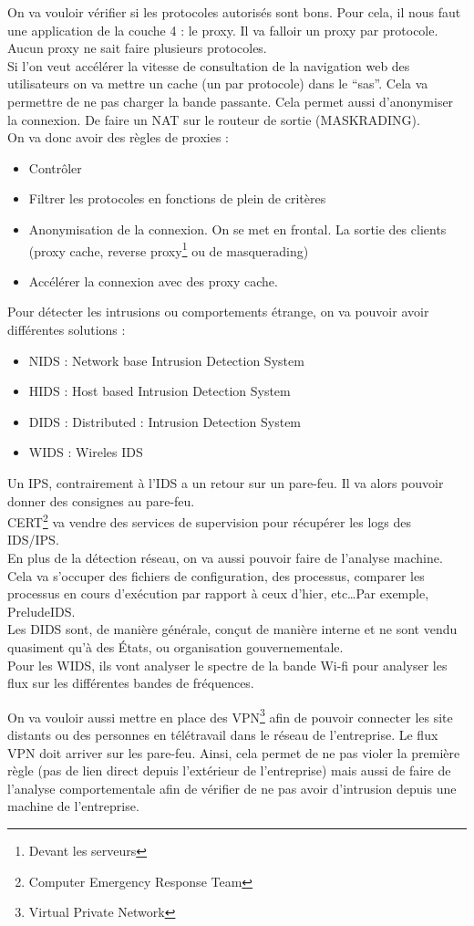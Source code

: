 On va vouloir vérifier si les protocoles autorisés sont bons. Pour cela, il nous faut une application de la couche 4 : le proxy. Il va falloir un proxy par protocole. Aucun proxy ne sait faire plusieurs protocoles.\\
Si l'on veut accélérer la vitesse de consultation de la navigation web des utilisateurs on va mettre un cache (un par protocole) dans le \enquote{sas}. Cela va permettre de ne pas charger la bande passante. Cela permet aussi d'anonymiser la connexion. De faire un NAT sur le routeur de sortie (MASKRADING).\\
On va donc avoir des règles de proxies :
\begin{itemize}
 \item Contrôler
 \item Filtrer les protocoles en fonctions de plein de critères
 \item Anonymisation de la connexion. On se met en frontal. La sortie des clients (proxy cache, reverse proxy\footnote{Devant les serveurs} ou de masquerading)
 \item Accélérer la connexion avec des proxy cache.
\end{itemize}
Pour détecter les intrusions ou comportements étrange, on va pouvoir avoir différentes solutions :
\begin{itemize}
 \item NIDS : Network base Intrusion Detection System
 \item HIDS : Host based Intrusion Detection System
 \item DIDS : Distributed : Intrusion Detection System
 \item WIDS : Wireles IDS
\end{itemize}
Un IPS, contrairement à l'IDS a un retour sur un pare-feu. Il va alors pouvoir donner des consignes au pare-feu.\\
CERT\footnote{Computer Emergency Response Team} va vendre des services de supervision pour récupérer les logs des IDS/IPS.\\
En plus de la détection réseau, on va aussi pouvoir faire de l'analyse machine. Cela va s'occuper des fichiers de configuration, des processus, comparer les processus en cours d'exécution par rapport à ceux d'hier, etc\ldots Par exemple, PreludeIDS\cite{PRELUDE}.\\
Les DIDS sont, de manière générale, conçut de manière interne et ne sont vendu quasiment qu'à des États, ou organisation gouvernementale.\\
Pour les WIDS, ils vont analyser le spectre de la bande Wi-fi pour analyser les flux sur les différentes bandes de fréquences.\\\par
On va vouloir aussi mettre en place des VPN\footnote{Virtual Private Network} afin de pouvoir connecter les site distants ou des personnes en télétravail dans le réseau de l'entreprise. Le flux VPN doit arriver sur les pare-feu. Ainsi, cela permet de ne pas violer la première règle (pas de lien direct depuis l'extérieur de l'entreprise) mais aussi de faire de l'analyse comportementale afin de vérifier de ne pas avoir d'intrusion depuis une machine de l'entreprise.